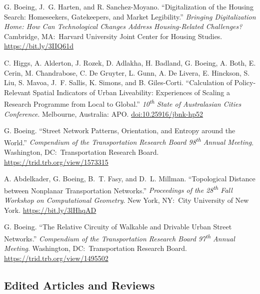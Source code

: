 \documentclass[11pt,letterpaper]{report} %
\begin{document}
\begin{tablist}

\item[2023] \tab{}G. Boeing, J.~G. Harten, and R. Sanchez-Moyano. \enquote{Digitalization of the Housing Search: Homeseekers, Gatekeepers, and Market Legibility.} \textit{Bringing Digitalization Home: How Can Technological Changes Address Housing-Related Challenges?} Cambridge, MA:\ Harvard University Joint Center for Housing Studies. \href{https://bit.ly/3IIQ61d}{https://bit.ly/3IIQ61d}

\item[2022] \tab{}C. Higgs, A. Alderton, J. Rozek, D. Adlakha, H. Badland, G. Boeing, A. Both, E. Cerin, M. Chandrabose, C. De Gruyter, L. Gunn, A. De Livera, E. Hinckson, S. Liu, S. Mavoa, J.~F. Sallis, K. Simons, and B. Giles-Corti. \enquote{Calculation of Policy-Relevant Spatial Indicators of Urban Liveability: Experiences of Scaling a Research Programme from Local to Global.} \textit{10\textsuperscript{th} State of Australasian Cities Conference}. Melbourne, Australia: APO\@. \href{https://doi.org/10.25916/jbnk-hp52}{doi:10.25916/jbnk-hp52}

\item[2019] \tab{}G. Boeing. \enquote{Street Network Patterns, Orientation, and Entropy around the World.} \textit{Compendium of the Transportation Research Board 98\textsuperscript{th} Annual Meeting}. Washington, DC:\ Transportation Research Board. \href{https://trid.trb.org/view/1573315}{https://trid.trb.org/view/1573315}

\item[2018] \tab{}A. Abdelkader, G. Boeing, B.~T. Fasy, and D.~L. Millman. \enquote{Topological Distance between Nonplanar Transportation Networks.} \textit{Proceedings of the 28\textsuperscript{th} Fall Workshop on Computational Geometry}. New York, NY:\ City University of New York. \href{https://bit.ly/3lHhqAD}{https://bit.ly/3lHhqAD}

\item[2018] \tab{}G. Boeing. \enquote{The Relative Circuity of Walkable and Drivable Urban Street Networks.} \textit{Compendium of the Transportation Research Board 97\textsuperscript{th} Annual Meeting}. Washington, DC:\ Transportation Research Board. \href{https://trid.trb.org/view/1495502}{https://trid.trb.org/view/1495502}

\end{tablist}

\subsection*{Edited Articles and Reviews}
\end{document}
